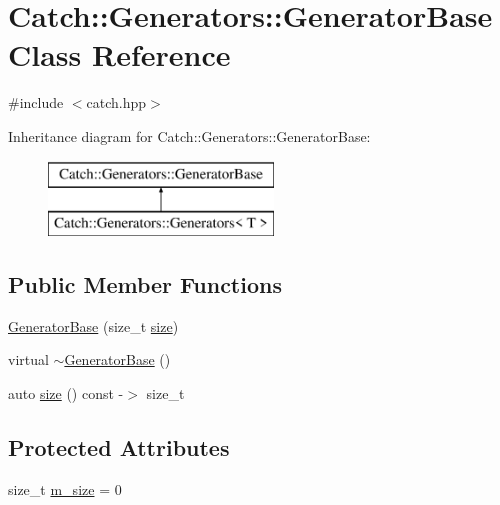 \hypertarget{class_catch_1_1_generators_1_1_generator_base}{}\section{Catch\+:\+:Generators\+:\+:Generator\+Base Class Reference}
\label{class_catch_1_1_generators_1_1_generator_base}


{\ttfamily \#include $<$catch.\+hpp$>$}

Inheritance diagram for Catch\+:\+:Generators\+:\+:Generator\+Base\+:\begin{figure}[H]
\begin{center}
\leavevmode
\includegraphics[height=2.000000cm]{class_catch_1_1_generators_1_1_generator_base}
\end{center}
\end{figure}
\subsection*{Public Member Functions}
\begin{DoxyCompactItemize}
\item 
\mbox{\hyperlink{class_catch_1_1_generators_1_1_generator_base_ab003974d458a14acfb48f79e7e8abe21}{Generator\+Base}} (size\+\_\+t \mbox{\hyperlink{class_catch_1_1_generators_1_1_generator_base_a2fb4a5c153f3fdc2708245b40751b487}{size}})
\item 
virtual \mbox{\hyperlink{class_catch_1_1_generators_1_1_generator_base_a6941ab95f6e2a7a2aaa64f0c94b7322c}{$\sim$\+Generator\+Base}} ()
\item 
auto \mbox{\hyperlink{class_catch_1_1_generators_1_1_generator_base_a2fb4a5c153f3fdc2708245b40751b487}{size}} () const -\/$>$ size\+\_\+t
\end{DoxyCompactItemize}
\subsection*{Protected Attributes}
\begin{DoxyCompactItemize}
\item 
size\+\_\+t \mbox{\hyperlink{class_catch_1_1_generators_1_1_generator_base_ac6ab90adfdda9401e2ea03db5b2dfc6a}{m\+\_\+size}} = 0
\end{DoxyCompactItemize}


